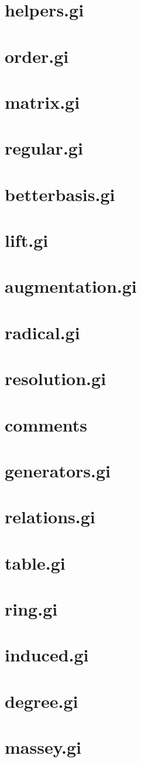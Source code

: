 \documentclass{article}
\begin{document}
\section{helpers.gi}
\section{order.gi}
\section{matrix.gi}
\section{regular.gi}
\section{betterbasis.gi}
\section{lift.gi}
\section{augmentation.gi}
\section{radical.gi}

\section{resolution.gi}
\section{comments}
\section{generators.gi}
\section{relations.gi}

\section{table.gi}
\section{ring.gi}
\section{induced.gi}
\section{degree.gi}
\section{massey.gi}
\end{document}
